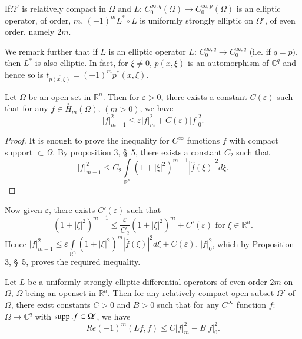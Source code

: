 \begin{coro*} %
  If\pageoriginale $\Omega'$ is relatively compact in $\Omega$ and $L$: $C^{\infty,
    q}_0 (\Omega) \to C^{\infty, p}_0 (\Omega)$ is an elliptic
  operator, of order, $m$, $(-1)^m L^* \circ L$ is uniformly strongly
  elliptic on $\Omega'$, of even order, namely $2m$. 
\end{coro*}

We remark further that if $L$ is an elliptic operator $L$: $C^{\infty,
  q}_0 \to C^{\infty, q}_0$ (i.e. if $q = p)$, then $L^*$ is also
elliptic. In fact, for $\xi \neq 0$, $p(x, \xi)$ is an automorphism of
$\mathbb{C}^q$ and hence so is $t_{\overline{p(x, \xi)}}= (-1)^m p^*
(x, \xi)$.   

\setcounter{proposition}{0}
\begin{proposition}\label{chap3:sec6:prop1}
  Let $\Omega$ be an open set in $\mathbb{R}^n$. Then for $\varepsilon
  > 0$, there exists a constant $C(\varepsilon)$ such that for any $f
  \in \overset{\circ}{H}_m (\Omega)$, $(m > 0)$, we have  
  $$
  | f|^2_{m-1} \le \varepsilon | f |^2_m + C(\varepsilon) | f |^2_0.
  $$
\end{proposition}

\begin{proof}
  It is enough to prove the inequality for $C^\infty$ functions $f$
  with compact support $\subset \Omega$. By proposition 3, \S\ 5, there
  exists a constant $C_2$ such that  
  $$
  | f |^2_{m-1} \le C_2 \int\limits_{\mathbb{R}^n} (1+ | \xi
  |^2)^{m-1} | \hat{f} (\xi ) |^2 d \xi. 
  $$
\end{proof}

Now given $\varepsilon$, there exists $C' (\varepsilon)$ such that
$$
\left(1+ | \xi |^2\right)^{m-1} \le \frac{\varepsilon}{C_2} \left(1+ |
\xi |^2\right)^m + 
C'(\varepsilon ) \text { for } \xi \in \mathbb{R}^n. 
$$
Hence $| f |^2_{m-1} \le \varepsilon \int\limits_{\mathbb{R}^n} (1+ |
\xi |^2 )^m | \hat{f} (\xi) |^2 d \xi + C(\varepsilon)$. $| f |^2_0$,
which by Proposition 3, \S\ 5, proves the required inequality. 

\setcounter{theorem}{0}
\begin{theorem}\label{chap3:sec6:thm1} %
  Let $L$ be a uniformly strongly elliptic differential operators of
  even order $2m$ on $\Omega$, $\Omega$ being an open\pageoriginale set in
  $\mathbb{R}^n$. Then for any relatively compact open subset $\Omega'$
  of $\Omega$, there exist constants $C> 0$ and $B>0$ such that for
  any $C^ \infty$ function $f$: $\Omega \to \mathbb{C}^q$ with
  $\operatorname{supp}. f \subset \Omega'$, we have 
  $$
  Re (-1)^m (Lf, f) \le C | f |^2_m - B | f |^2_0.
  $$
\end{theorem}

